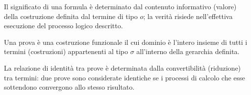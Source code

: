 \begin{description}[leftmargin=1.5em, style=nextline, font=\bfseries]
    \item[Termini $M^o$] 
        Il significato di una formula è determinato dal contenuto informativo (valore) della costruzione definita
        dal termine di tipo $o$; la verità risiede nell'effettiva esecuzione del processo logico descritto.
    \item[$\forall x^\sigma \Phi$] 
        Una prova è una costruzione funzionale il cui dominio è l'intero insieme di tutti i termini (costruzioni) 
        appartenenti al tipo $\sigma$ all'interno della gerarchia definita.
    \item[Identità] 
        La relazione di identità tra prove è determinata dalla convertibilità (riduzione) tra termini: due prove 
        sono considerate identiche se i processi di calcolo che esse sottendono convergono allo stesso risultato.
\end{description}
